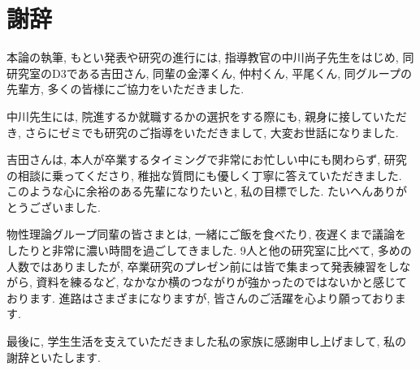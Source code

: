 \chapter*{謝辞}

本論の執筆, もとい発表や研究の進行には, 指導教官の中川尚子先生をはじめ, 同研究室のD3である吉田さん, 同輩の金澤くん, 仲村くん, 平尾くん, 同グループの先輩方, 多くの皆様にご協力をいただきました. 

中川先生には, 院進するか就職するかの選択をする際にも, 親身に接していただき, さらにゼミでも研究のご指導をいただきまして, 大変お世話になりました. 

吉田さんは, 本人が卒業するタイミングで非常にお忙しい中にも関わらず, 研究の相談に乗ってくださり, 稚拙な質問にも優しく丁寧に答えていただきました. このような心に余裕のある先輩になりたいと, 私の目標でした. たいへんありがとうございました. 

物性理論グループ同輩の皆さまとは, 一緒にご飯を食べたり, 夜遅くまで議論をしたりと非常に濃い時間を過ごしてきました. 9人と他の研究室に比べて, 多めの人数ではありましたが, 卒業研究のプレゼン前には皆で集まって発表練習をしながら, 資料を練るなど, なかなか横のつながりが強かったのではないかと感じております. 進路はさまざまになりますが, 皆さんのご活躍を心より願っております.

最後に, 学生生活を支えていただきました私の家族に感謝申し上げまして, 私の謝辞といたします.

